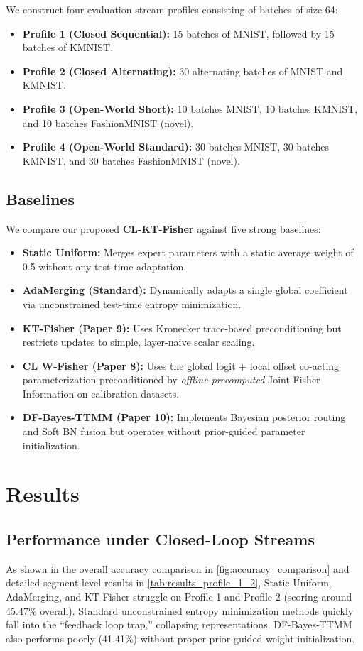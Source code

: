 \documentclass{article}
\theoremstyle{plain}
\theoremstyle{definition}
\theoremstyle{remark}
\begin{document}
We construct four evaluation stream profiles consisting of batches of size 64:
\begin{itemize}
    \item \textbf{Profile 1 (Closed Sequential):} 15 batches of MNIST, followed by 15 batches of KMNIST.
    \item \textbf{Profile 2 (Closed Alternating):} 30 alternating batches of MNIST and KMNIST.
    \item \textbf{Profile 3 (Open-World Short):} 10 batches MNIST, 10 batches KMNIST, and 10 batches FashionMNIST (novel).
    \item \textbf{Profile 4 (Open-World Standard):} 30 batches MNIST, 30 batches KMNIST, and 30 batches FashionMNIST (novel).
\end{itemize}

\subsection{Baselines}
We compare our proposed \textbf{CL-KT-Fisher} against five strong baselines:
\begin{itemize}
    \item \textbf{Static Uniform:} Merges expert parameters with a static average weight of 0.5 without any test-time adaptation.
    \item \textbf{AdaMerging (Standard):} Dynamically adapts a single global coefficient via unconstrained test-time entropy minimization.
    \item \textbf{KT-Fisher (Paper 9):} Uses Kronecker trace-based preconditioning but restricts updates to simple, layer-naive scalar scaling.
    \item \textbf{CL W-Fisher (Paper 8):} Uses the global logit + local offset co-acting parameterization preconditioned by \textit{offline precomputed} Joint Fisher Information on calibration datasets.
    \item \textbf{DF-Bayes-TTMM (Paper 10):} Implements Bayesian posterior routing and Soft BN fusion but operates without prior-guided parameter initialization.
\end{itemize}

\section{Results}
\label{sec:results}

\subsection{Performance under Closed-Loop Streams}
As shown in the overall accuracy comparison in \cref{fig:accuracy_comparison} and detailed segment-level results in \cref{tab:results_profile_1_2}, Static Uniform, AdaMerging, and KT-Fisher struggle on Profile 1 and Profile 2 (scoring around 45.47\% overall). Standard unconstrained entropy minimization methods quickly fall into the ``feedback loop trap,'' collapsing representations. DF-Bayes-TTMM also performs poorly (41.41\%) without proper prior-guided weight initialization. 
\end{document}
